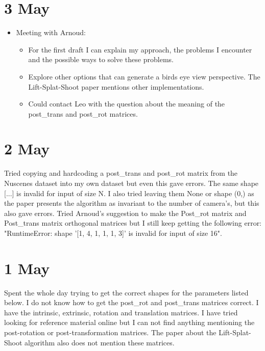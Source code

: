 \documentclass[twoside]{report}
\begin{document}
\section*{3 May}
\begin{itemize}
    \item Meeting with Arnoud:
    \begin{itemize}
        \item For the first draft I can explain my approach, the problems I encounter and the possible ways to solve these problems.
        \item Explore other options that can generate a birds eye view perspective. The Lift-Splat-Shoot paper mentions other implementations.
        \item Could contact Leo with the question about the meaning of the post\_trans and post\_rot matrices. 
    \end{itemize}
\end{itemize}

\section*{2 May}
Tried copying and hardcoding a post\_trans and post\_rot matrix from the Nuscenes dataset into my own dataset but even this gave errors. The same shape [...] is invalid for input of size N. I also tried leaving them None or shape (0,) as the paper presents the algorithm as invariant to the number of camera's, but this also gave errors.
\newline
Tried Arnoud's suggestion to make the Post\_rot matrix and Post\_trans matrix orthogonal matrices but I still keep getting the following error: "RuntimeError: shape '[1, 4, 1, 1, 1, 3]' is invalid for input of size 16". 

\section*{1 May}
Spent the whole day trying to get the correct shapes for the parameters listed below. I do not know how to get the post\_rot and post\_trans matrices correct. I have the intrinsic, extrinsic, rotation and translation matrices. I have tried looking for reference material online but I can not find anything mentioning the post-rotation or post-transformation matrices. The paper about the Lift-Splat-Shoot algorithm also does not mention these matrices.
\end{document}
